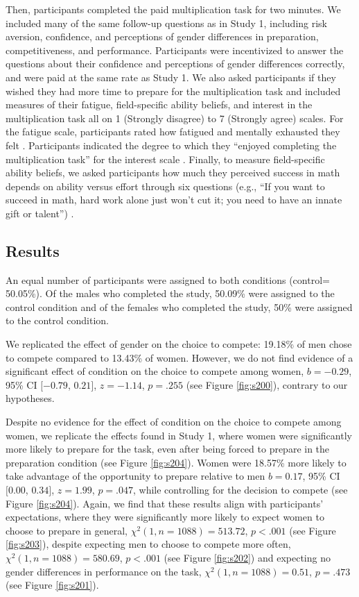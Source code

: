 \documentclass[a4paper, nobind]{templates/ociamthesis}
\begin{document}
Then, participants completed the paid multiplication task for two minutes. We included many of the same follow-up questions as in Study 1, including risk aversion, confidence, and perceptions of gender differences in preparation, competitiveness, and performance. Participants were incentivized to answer the questions about their confidence and perceptions of gender differences correctly, and were paid at the same rate as Study 1. We also asked participants if they wished they had more time to prepare for the multiplication task and included measures of their fatigue, field-specific ability beliefs, and interest in the multiplication task all on 1 (Strongly disagree) to 7 (Strongly agree) scales. For the fatigue scale, participants rated how fatigued and mentally exhausted they felt \autocite{Milyavskaya2018}. Participants indicated the degree to which they ``enjoyed completing the multiplication task'' for the interest scale \autocite{Milyavskaya2018}. Finally, to measure field-specific ability beliefs, we asked participants how much they perceived success in math depends on ability versus effort through six questions (e.g., ``If you want to succeed in math, hard work alone just won't cut it; you need to have an innate gift or talent'') \autocite{Meyer2015}.

\hypertarget{results-1}{%
\subsection{Results}\label{results-1}}

An equal number of participants were assigned to both conditions (control= 50.05\%). Of the males who completed the study, 50.09\% were assigned to the control condition and of the females who completed the study, 50\% were assigned to the control condition.

We replicated the effect of gender on the choice to compete: 19.18\% of men chose to compete compared to 13.43\% of women. However, we do not find evidence of a significant effect of condition on the choice to compete among women, \(b = -0.29\), 95\% CI \([-0.79\), \(0.21]\), \(z = -1.14\), \(p = .255\) (see Figure \ref{fig:s200}), contrary to our hypotheses.

Despite no evidence for the effect of condition on the choice to compete among women, we replicate the effects found in Study 1, where women were significantly more likely to prepare for the task, even after being forced to prepare in the preparation condition (see Figure \ref{fig:s204}). Women were 18.57\% more likely to take advantage of the opportunity to prepare relative to men \(b = 0.17\), 95\% CI \([0.00\), \(0.34]\), \(z = 1.99\), \(p = .047\), while controlling for the decision to compete (see Figure \ref{fig:s204}). Again, we find that these results align with participants' expectations, where they were significantly more likely to expect women to choose to prepare in general, \(\chi^2(1, n = 1088) = 513.72\), \(p < .001\) (see Figure \ref{fig:s203}), despite expecting men to choose to compete more often, \(\chi^2(1, n = 1088) = 580.69\), \(p < .001\) (see Figure \ref{fig:s202}) and expecting no gender differences in performance on the task, \(\chi^2(1, n = 1088) = 0.51\), \(p = .473\) (see Figure \ref{fig:s201}).
\end{document}
